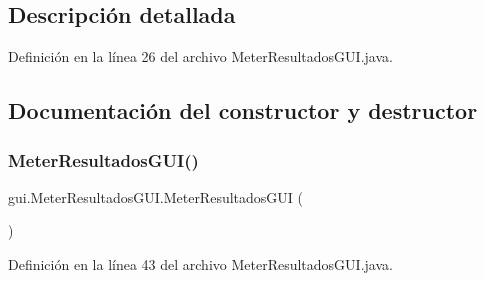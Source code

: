 \subsection{Descripción detallada}


Definición en la línea 26 del archivo Meter\+Resultados\+G\+U\+I.\+java.



\subsection{Documentación del constructor y destructor}
\mbox{\label{classgui_1_1MeterResultadosGUI_a9499e52fa7b3e85edb2ace269393b2c4}} 
\subsubsection{\texorpdfstring{MeterResultadosGUI()}{MeterResultadosGUI()}}
{\footnotesize\ttfamily gui.\+Meter\+Resultados\+G\+U\+I.\+Meter\+Resultados\+G\+UI (\begin{DoxyParamCaption}{ }\end{DoxyParamCaption})}



Definición en la línea 43 del archivo Meter\+Resultados\+G\+U\+I.\+java.



